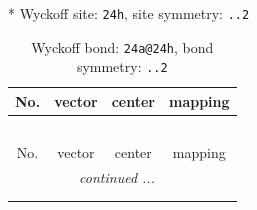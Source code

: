 \documentclass[fleqn,8pt]{jsarticle}
\begin{document}
* Wyckoff site: {\tt 24h}, site symmetry: {\tt ..2}
\renewcommand{\arraystretch}{1.2}
\begin{longtable}{cccc}
\caption{Wyckoff bond: {\tt 24a@24h}, bond symmetry: {\tt ..2}}
 \\
 \hline \hline
No. & vector & center & mapping \\ \hline \endfirsthead

\multicolumn{3}{l}{\tablename\ \thetable{}} \\
 \hline \hline
No. & vector & center & mapping \\ \hline \endhead

 \hline \hline
\multicolumn{3}{r}{\footnotesize\it continued ...} \\ \endfoot

 \hline \hline
\multicolumn{3}{r}{} \\ \endlastfoot


\end{longtable}
\end{document}
